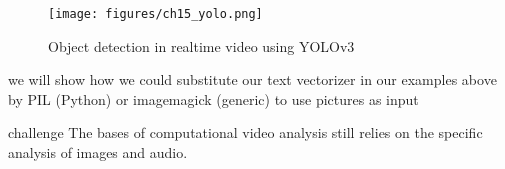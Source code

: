 \begin{figure}
\centering
\texttt{[image: figures/ch15\_yolo.png]}
\caption{Object detection in real\-time video using YOLOv3}
\label{fig:yolo}
\end{figure}










we will show how we could substitute our text vectorizer in our examples above by PIL (Python) or imagemagick (generic) to use pictures as input



challenge
The bases of computational video analysis still relies on the specific analysis of images and audio.